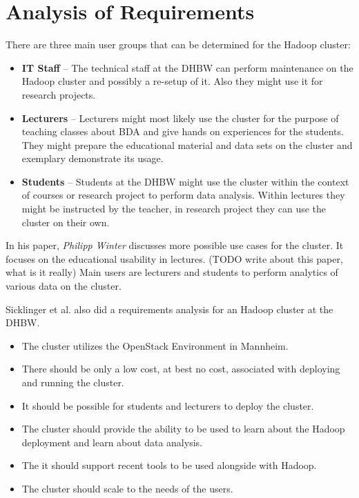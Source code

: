 \section{Analysis of Requirements}

There are three main user groups that can be determined for the Hadoop cluster:

\begin{itemize}
    \item \textbf{IT Staff} -- The technical staff at the \ac{DHBW} can perform maintenance on the Hadoop cluster and possibly a re-setup of it.
    Also they might use it for research projects.
    \item \textbf{Lecturers} -- Lecturers might most likely use the cluster for the purpose of teaching classes about \ac{BDA} and give hands on experiences for the students. They might prepare the educational material and data sets on the cluster and exemplary demonstrate its usage.
    \item \textbf{Students} -- Students at the \ac{DHBW} might use the cluster within the context of courses or research project to perform data analysis. Within lectures they might be instructed by the teacher, in research project they can use the cluster on their own.
\end{itemize}

In his paper, \emph{Philipp Winter} discusses more possible use cases for the cluster. It focuses on the educational usability in lectures.
(TODO write about this paper, what is it really)
Main users are lecturers and students to perform analytics of various data on the cluster.

Sicklinger et al. also did a requirements analysis for an Hadoop cluster at the \ac{DHBW}. 
\begin{itemize}
    \item The cluster utilizes the OpenStack Environment in Mannheim.
    \item There should be only a low cost, at best no cost, associated with deploying and running the cluster.
    \item It should be possible for students and lecturers to deploy the cluster.
    \item The cluster should provide the ability to be used to learn about the Hadoop deployment and learn about data analysis.
    \item The it should support recent tools to be used alongside with Hadoop.
    \item The cluster should scale to the needs of the users.
\end{itemize}
\autocite[][p. 40ff]{wi2018managementsystems}


